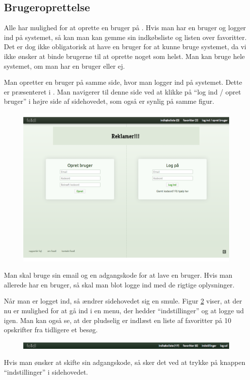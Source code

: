 \subsection{Brugeroprettelse}
\label{subsec:brug-opret}

Alle har mulighed for at oprette en bruger på \Foodl{}. Hvis man har en bruger og logger ind på systemet, så kan man kan gemme sin indkøbsliste og listen over favoritter. Det er dog ikke obligatorisk at have en bruger for at kunne bruge systemet, da vi ikke ønsker at binde brugerne til at oprette noget som helst. Man kan bruge hele systemet, om man har en bruger eller ej.

Man opretter en bruger på samme side, hvor man logger ind på systemet. Dette er præsenteret i . Man navigerer til denne side ved at klikke på ``log ind / opret bruger'' i højre side af sidehovedet, som også er synlig på samme figur.

\begin{figure}[H]
	\centering
	\includegraphics[scale=0.4]{billeder/foodl/thumbnails/opretbrugeroglogind.png}
	\label{fig:overblik-brugeroprettelse}
\end{figure}

Man skal bruge sin email og en adgangskode for at lave en bruger. Hvis man allerede har en bruger, så skal man blot logge ind med de rigtige oplysninger.

Når man er logget ind, så ændrer sidehovedet sig en smule. Figur \ref{fig:foodl-loggetind} viser, at der nu er mulighed for at gå ind i en menu, der hedder ``indstillinger'' og at logge ud igen. Man kan også se, at der pludselig er indlæst en liste af favoritter på 10 opskrifter fra tidligere et besøg.

\begin{figure}[H]
	\centering
	\includegraphics[scale=0.4]{billeder/foodl/header-login.png}
	\label{fig:foodl-loggetind}
\end{figure}

Hvis man ønsker at skifte sin adgangskode, så sker det ved at trykke på knappen ``indstillinger'' i sidehovedet.
